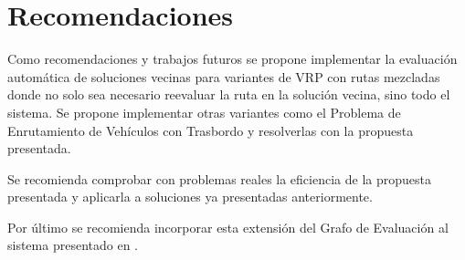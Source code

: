 \chapter*{Recomendaciones}\label{chapter:Recomendations}


Como recomendaciones y trabajos futuros se propone implementar la evaluación automática de soluciones vecinas para variantes de VRP con rutas mezcladas donde no solo sea necesario reevaluar la ruta en la solución vecina, sino todo el sistema. Se propone implementar otras variantes como el Problema de Enrutamiento de Vehículos con Trasbordo y resolverlas con la propuesta presentada.

Se recomienda comprobar con problemas reales la eficiencia de la propuesta presentada y aplicarla a soluciones ya presentadas anteriormente.

Por último se recomienda incorporar esta extensión del Grafo de Evaluación al sistema presentado en \cite{Rodrigo}.